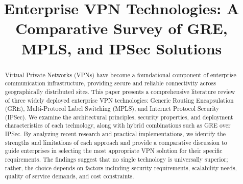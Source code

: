 \documentclass[conference]{IEEEtran}
\begin{document}
\title{Enterprise VPN Technologies: A Comparative Survey of GRE, MPLS, and IPSec Solutions}

\author{
    \and
    \and
}

\maketitle

\begin{abstract}
Virtual Private Networks (VPNs) have become a foundational component
of enterprise communication infrastructure, providing secure and
reliable connectivity across geographically distributed sites. This
paper presents a comprehensive literature review of three widely
deployed enterprise VPN technologies: Generic Routing Encapsulation
(GRE), Multi-Protocol Label Switching (MPLS), and Internet Protocol
Security (IPSec). We examine the architectural principles, security
properties, and deployment characteristics of each technology, along
with hybrid combinations such as GRE over IPSec. By analyzing recent
research and practical implementations, we identify the strengths and
limitations of each approach and provide a comparative discussion to
guide enterprises in selecting the most appropriate VPN solution for
their specific requirements. The findings suggest that no single
technology is universally superior; rather, the choice depends on
factors including security requirements, scalability needs, quality
of service demands, and cost constraints.
\end{abstract}
\end{document}
